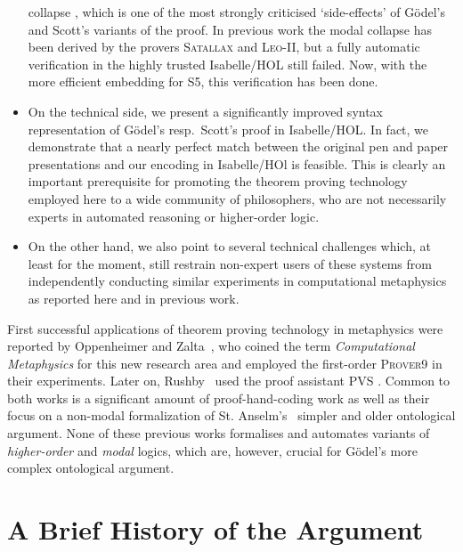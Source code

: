 \documentclass{article}
\begin{document}
\begin{itemize}
  collapse \cite{Sobel}, which is one of the most strongly criticised
  `side-effects' of G\"odel's and Scott's variants of the proof. In previous work
  the modal collapse has been derived by the provers
  \textsc{Satallax} \cite{Satallax} and \textsc{Leo-II}, but a fully automatic
  verification in the highly trusted Isabelle/HOL still failed. 
  Now, with the more efficient embedding for S5, this verification has been done. 
\item On the technical side, we present a significantly improved
  syntax representation of G\"odel's resp.~Scott's proof in
  Isabelle/HOL. In fact, we demonstrate that a nearly perfect match
  between the original pen and paper presentations and our encoding in
  Isabelle/HOl is feasible. This is clearly an important prerequisite
  for promoting the theorem proving technology employed here to a wide community of
  philosophers, who are not necessarily experts in automated reasoning or higher-order logic.
\item On the other hand, we
  also point to several technical challenges which, at least for the
  moment, still restrain non-expert users of these systems from
  independently conducting similar experiments in computational
  metaphysics as reported here and in previous work. 
\end{itemize}


First successful applications of theorem proving technology in
metaphysics were reported by Oppenheimer and
Zalta~, who coined the term \textit{Computational Metaphysics} for this new research area and employed the first-order
\textsc{Prover9} \cite{Prover9} in their experiments. Later on, Rushby~ used the proof assistant \textsc{PVS} \cite{PVS}. Common to both
works is a significant amount of proof-hand-coding work as well as their
focus on a non-modal formalization of St. Anselm's~ simpler 
and older ontological argument. 
None of these previous works formalises and automates variants of \emph{higher-order} and \emph{modal} logics, which are, however, crucial
for G\"{o}del's more complex ontological argument.


\section{A Brief History of the Argument}
\end{document}
